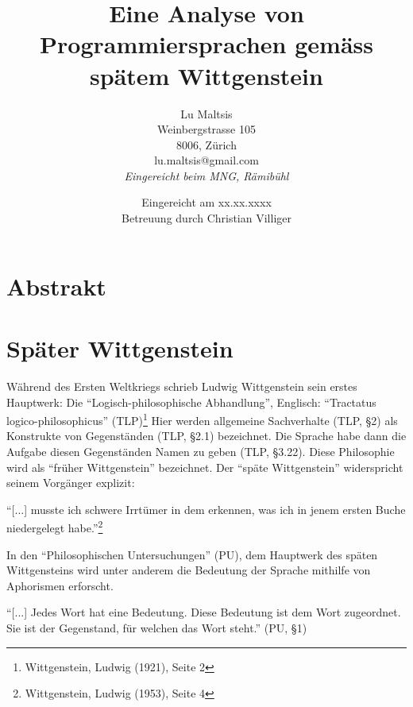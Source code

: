 \documentclass[a4paper,12pt]{article}
\begin{document}
\title{\Large{\textbf{Eine Analyse von Programmiersprachen gemäss spätem Wittgenstein}}}
\author{Lu Maltsis \\
Weinbergstrasse 105 \\
8006, Zürich \\
lu.maltsis@gmail.com \\
\textit{Eingereicht beim MNG, Rämibühl}
}
\date{Eingereicht am xx.xx.xxxx \\
\vspace{10mm}
Betreuung durch Christian Villiger}
\maketitle
\newpage


\section{Abstrakt}
\blindtext[1]


\tableofcontents{}


\section{Später Wittgenstein}
Während des Ersten Weltkriegs schrieb Ludwig Wittgenstein sein erstes Hauptwerk: Die \enquote{Logisch-philosophische Abhandlung}, Englisch: \enquote{Tractatus logico-philosophicus} (TLP)\footnote{Wittgenstein, Ludwig (1921), Seite 2} Hier werden allgemeine Sachverhalte (TLP, §2) als Konstrukte von Gegenständen (TLP, §2.1) bezeichnet. Die Sprache habe dann die Aufgabe diesen Gegenständen Namen zu geben (TLP, §3.22). Diese Philosophie wird als \enquote{früher Wittgenstein} bezeichnet. Der \enquote{späte Wittgenstein} widerspricht seinem Vorgänger explizit:
\begin{displayquote}
\enquote{[...] musste ich schwere Irrtümer in dem erkennen, was ich in jenem ersten Buche niedergelegt habe.}\footnote{Wittgenstein, Ludwig (1953), Seite 4}
\end{displayquote}
In den \enquote{Philosophischen Untersuchungen} (PU), dem Hauptwerk des späten Wittgensteins wird unter anderem die Bedeutung der Sprache mithilfe von Aphorismen erforscht. 
\begin{displayquote}
\enquote{[...] Jedes Wort hat eine Bedeutung. Diese Bedeutung ist dem Wort zugeordnet. Sie ist der Gegenstand, für welchen das Wort steht.} \hspace{1mm} (PU, §1)
\end{displayquote}
\end{document}

